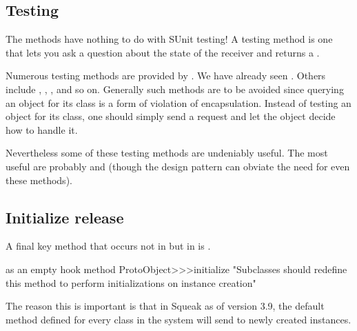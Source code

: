 \documentclass[a4paper,10pt,twoside]{book}
\begin{document}
\subsection{Testing}

The  methods have nothing to do with SUnit testing! A testing method is one that lets you ask a question about the state of the receiver and returns a .

Numerous testing methods are provided by . We have already seen . Others include , , ,  and so on. Generally such methods are to be avoided since querying an object for its class is a form of violation of encapsulation. Instead of testing an object for its class, one should simply send a request and let the object decide how to handle it.

Nevertheless some of these testing methods are undeniably useful. The most useful are probably  and  (though the \cite{Wool98a} design pattern can obviate the need for even these methods).


\subsection{Initialize release}

A final key method that occurs not in  but in  is .

\begin{method}{ as an empty hook method}
ProtoObject>>>initialize
    "Subclasses should redefine this method to perform initializations on instance creation"
\end{method}

The reason this is important is that in Squeak as of version 3.9, the default  method defined for every class in the system will send  to newly created instances.
\end{document}
